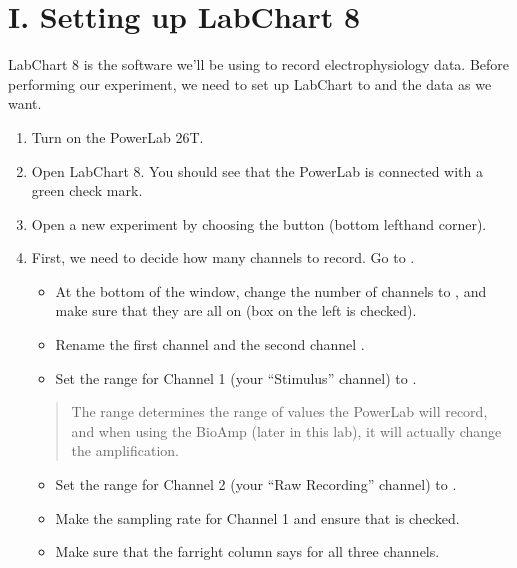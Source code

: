 \documentclass[letterpaper,10pt,english]{jupyterBook}
\begin{document}
\section{I. Setting up LabChart 8}
\label{\detokenize{StringNervousSystems:i-setting-up-labchart-8}}
\sphinxAtStartPar
LabChart 8 is the software we’ll be using to record electrophysiology data. Before performing our experiment, we need to set up LabChart to  and  the data as we want.
\begin{enumerate}
%
\item {} 
\sphinxAtStartPar
Turn on the PowerLab 26T.

\item {} 
\sphinxAtStartPar
Open LabChart 8. You should see that the PowerLab is connected with a green check mark.

\item {} 
\sphinxAtStartPar
Open a new experiment by choosing the  button (bottom left\sphinxhyphen{}hand corner).

\item {} 
\sphinxAtStartPar
First, we need to decide how many channels to record. Go to .
\begin{itemize}
\item {} 
\sphinxAtStartPar
At the bottom of the window, change the number of channels to , and make sure that they are all on (box on the left is checked).

\item {} 
\sphinxAtStartPar
Rename the first channel  and the second channel .

\item {} 
\sphinxAtStartPar
Set the range for Channel 1 (your “Stimulus” channel) to .

\end{itemize}
\begin{quote}

\sphinxAtStartPar
{} The range determines the range of values the PowerLab will record, and when using the BioAmp (later in this lab), it will actually change the amplification.
\end{quote}
\begin{itemize}
\item {} 
\sphinxAtStartPar
Set the range for Channel 2 (your “Raw Recording” channel) to .

\item {} 
\sphinxAtStartPar
Make the sampling rate for Channel 1  and ensure that  is checked.

\item {} 
\sphinxAtStartPar
Make sure that the far\sphinxhyphen{}right column says  for all three channels.

\end{itemize}

\end{enumerate}
\end{document}
